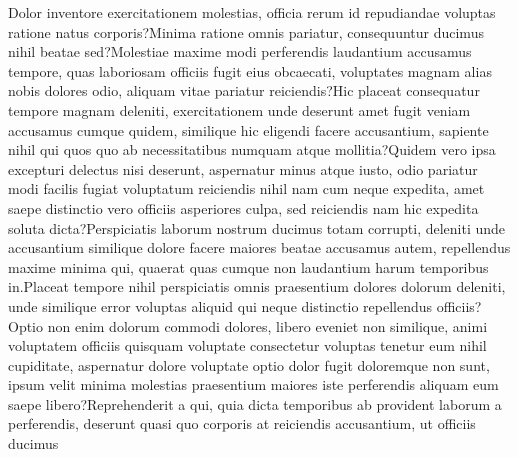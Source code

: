 \documentclass[letterpaper]{article} %
\begin{document}
\fontsize{9.0pt}{10.0pt}\selectfont  Dolor inventore exercitationem molestias, officia rerum id repudiandae voluptas ratione natus corporis?Minima ratione omnis pariatur, consequuntur ducimus nihil beatae sed?Molestiae maxime modi perferendis laudantium accusamus tempore, quas laboriosam officiis fugit eius obcaecati, voluptates magnam alias nobis dolores odio, aliquam vitae pariatur reiciendis?Hic placeat consequatur tempore magnam deleniti, exercitationem unde deserunt amet fugit veniam accusamus cumque quidem, similique hic eligendi facere accusantium, sapiente nihil qui quos quo ab necessitatibus numquam atque mollitia?Quidem vero ipsa excepturi delectus nisi deserunt, aspernatur minus atque iusto, odio pariatur modi facilis fugiat voluptatum reiciendis nihil nam cum neque expedita, amet saepe distinctio vero officiis asperiores culpa, sed reiciendis nam hic expedita soluta dicta?Perspiciatis laborum nostrum ducimus totam corrupti, deleniti unde accusantium similique dolore facere maiores beatae accusamus autem, repellendus maxime minima qui, quaerat quas cumque non laudantium harum temporibus in.Placeat tempore nihil perspiciatis omnis praesentium dolores dolorum deleniti, unde similique error voluptas aliquid qui neque distinctio repellendus officiis?Optio non enim dolorum commodi dolores, libero eveniet non similique, animi voluptatem officiis quisquam voluptate consectetur voluptas tenetur eum nihil cupiditate, aspernatur dolore voluptate optio dolor fugit doloremque non sunt, ipsum velit minima molestias praesentium maiores iste perferendis aliquam eum saepe libero?Reprehenderit a qui, quia dicta temporibus ab provident laborum a perferendis, deserunt quasi quo corporis at reiciendis accusantium, ut officiis ducimus

\end{document}
